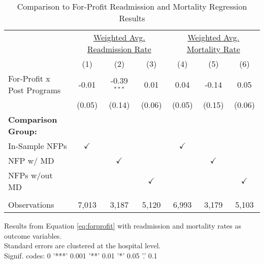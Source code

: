 \begin{table}[ht!]
   \caption{\label{tab:forprofit_readmort_fullsample} Comparison to For-Profit Readmission and Mortality Regression Results}
   \bigskip
   \centering
   \begin{tabular}{lcccccc}
      \toprule
       & \multicolumn{3}{c}{\underline{Weighted Avg. Readmission Rate}} & \multicolumn{3}{c}{\underline{Weighted Avg. Mortality Rate}}
       
       \vspace{2mm}\\
       
                                  & (1)           & (2)           & (3)           & (4)           & (5)           & (6)\\  
      \midrule 
      For-Profit x Post Programs  & -0.01         & -0.39$^{***}$ & 0.01          & 0.04          & -0.14         & 0.05\\   
                                  & (0.05)        & (0.14)        & (0.06)        & (0.05)        & (0.15)        & (0.06)\\   
      \textbf{Comparison Group:}  &               &               &               &               &               & \\  
      In-Sample NFPs              & $\checkmark$  &               &               & $\checkmark$  &               & \\  
      NFP w/ MD                   &               & $\checkmark$  &               &               & $\checkmark$  & \\  
      NFPs w/out MD               &               &               & $\checkmark$  &               &               & $\checkmark$\\   
       \\
      Observations                & 7,013         & 3,187         & 5,120         & 6,993         & 3,179         & 5,103\\  
      \bottomrule
   \end{tabular}
   
   \par \raggedright 
   Results from Equation \ref{eq:forprofit} with readmission and mortality rates as outcome variables.\\
   Standard errors are clustered at the hospital level.\\
   Signif. codes: 0 '***' 0.001 '**' 0.01 '*' 0.05 '.' 0.1
\end{table}
